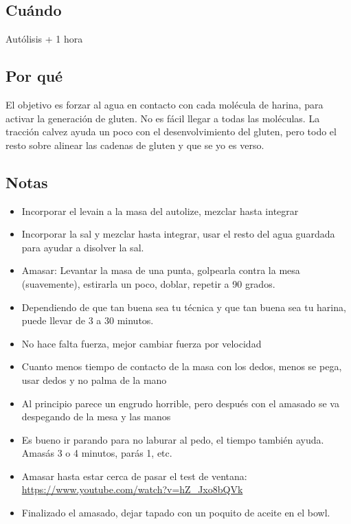 \documentclass[10pt,a4paper]{article}
\begin{document}
\subsection*{Cuándo}
  Autólisis + 1 hora

\subsection*{Por qué}
El objetivo es forzar al agua en contacto con cada molécula
de harina, para activar la generación de gluten. No es fácil
llegar a todas las moléculas. La tracción calvez ayuda un poco
con el desenvolvimiento del gluten, pero todo el resto sobre alinear
las cadenas de gluten y que se yo es verso.

\subsection*{Notas}
  \begin{itemize}
    \item Incorporar el levain a la masa del autolize, mezclar hasta integrar
    \item Incorporar la sal y mezclar hasta integrar, usar el resto del agua
      guardada para ayudar a disolver la sal.
    \item Amasar: Levantar la masa de una punta, golpearla contra la mesa (suavemente),
      estirarla un poco, doblar, repetir a 90 grados.
    \item Dependiendo de que tan buena sea tu técnica y que tan buena sea tu
      harina, puede llevar de 3 a 30 minutos.
    \item No hace falta fuerza, mejor cambiar fuerza por velocidad
    \item Cuanto menos tiempo de contacto de la masa  con los dedos,
      menos se pega, usar dedos y no palma de la mano
    \item Al principio parece un engrudo horrible, pero después con
      el amasado se va despegando de la mesa y las manos
    \item Es bueno ir parando para no laburar al pedo, el tiempo también ayuda.
      Amasás 3 o 4 minutos, parás 1, etc.
    \item Amasar hasta estar cerca de pasar el test de ventana:
      \url{https://www.youtube.com/watch?v=hZ_Jxo8bQVk}
    \item Finalizado el amasado, dejar tapado con un poquito de aceite
      en el bowl.

  \end{itemize}
\end{document}
